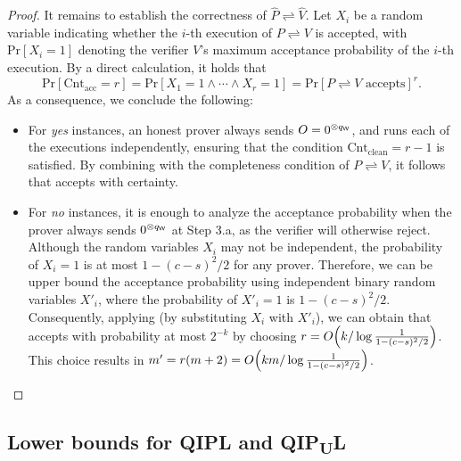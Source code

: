 \documentclass[11pt, a4paper]{article}
\numberwithin{equation}{section}
\numberwithin{figure}{section}
\newcommand{\QIPL}{\textnormal{\textsf{QIPL}}\xspace}
\newcommand{\QIPUL}{\texorpdfstring{\textnormal{\textsf{QIP}\textsubscript{\textnormal{U}}\textsf{L}}}\xspace}
\newcommand{\protocol}[2]{{#1}\!\rightleftharpoons\!{#2}}
\DeclarePairedDelimiter\rbra{\lparen}{\rparen}
\let\ket\relax\DeclarePairedDelimiter\ket{\lvert}{\rangle}
\newcommand{\Cnt}{\mathrm{Cnt}}
\newcommand{\clean}{\mathrm{clean}}
\newcommand{\acc}{\mathrm{acc}}
\renewcommand{\Pr}[1]{\mathrm{Pr}\left[#1\right]}
\newcommand{\sfW}{\mathsf{W}}
\newcommand{\hatP}{\widehat{P}}
\newcommand{\hatV}{\widehat{V}}
\begin{document}
\begin{proof}
    \vspace{1em}
    It remains to establish the correctness of $\protocol{\hatP}{\hatV}$. Let $X_i$ be a random variable indicating whether the $i$-th execution of $\protocol{P}{V}$ is accepted, with $\Pr{X_i = 1}$ denoting the verifier $V$'s maximum acceptance probability of the $i$-th execution.  
    By a direct calculation, it holds that
    \begin{equation}
        \label{eq:QIPL-error-reduction-AND}
        \Pr{\Cnt_{\acc} = r} = \Pr{ X_1=1 \wedge \cdots \wedge X_r = 1 } = 
        \Pr{\protocol{P}{V}\text{ accepts}}^r.
    \end{equation}
    As a consequence, we conclude the following: 
    \begin{itemize}[leftmargin=2em]
        \item For \textit{yes} instances, an honest prover always sends $\ket{O} = \ket{0}^{\otimes q_{\sfW}}$, 
        and runs each of the executions independently, ensuring that the condition $\Cnt_{\clean} = r-1$ is satisfied. By combining  with the completeness condition of $\protocol{P}{V}$, it follows that  accepts with certainty. 
        \item For \textit{no} instances, it is enough to analyze the acceptance probability when the prover always sends $\ket{0}^{\otimes q_{\sfW}}$ at Step 3.a, as the verifier will otherwise reject. 
        Although the random variables $X_i$ may not be independent, 
        the probability of $X_i=1$ is at most $1 - (c-s)^2/2$ for any prover. Therefore, we can be upper bound the acceptance probability using independent binary random variables $X'_i$, where the probability of $X'_i=1$ is $1 - (c-s)^2/2$. 
        Consequently, applying  (by substituting $X_i$ with $X'_i$), we can obtain that  accepts with probability at most $2^{-k}$ by choosing $r = O\rbra*{k/\log\frac{1}{1-(c-s)^2/2}}$. This choice results in $m' = r(m+2) = O\rbra*{km/\log\frac{1}{1-(c-s)^2/2}}$. \qedhere
    \end{itemize}
\end{proof}

\subsection{Lower bounds for \QIPL{} and \QIPUL{}}
\label{subsec:lower-bounds-QIPL}
\end{document}
